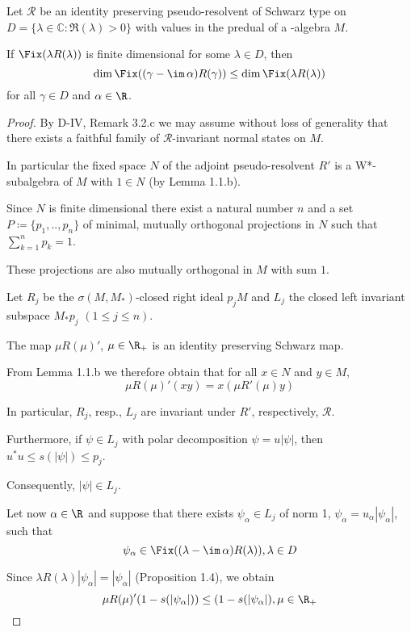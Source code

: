 \begin{proposition}\label{prop:d3-2.1}
Let $\mathcal{R}$ be an identity preserving pseudo-resolvent of Schwarz type on $D = \{\lambda \in \mathbb{C} \colon \Re(\lambda) > 0\}$ with values in the predual of a \WA-algebra $M$.

If $\Fix(\lambda R(\lambda))$ is finite dimensional for some $\lambda \in D$, then
\[
\dim \Fix((\gamma - \im\,\alpha)R(\gamma)) \leq \dim \Fix(\lambda R(\lambda))
\]
for all $\gamma \in D$ and $\alpha \in \R$.
\end{proposition}

\begin{proof}
By D-IV, Remark 3.2.c we may assume without loss of generality that there exists a faithful family of $\mathcal{R}$-invariant normal states on $M$.

In particular the fixed space $N$ of the adjoint pseudo-resolvent $R'$ is a W*-subalgebra of $M$ with $1 \in N$ (by Lemma 1.1.b).

Since $N$ is finite dimensional there exist a natural number $n$ and a set $P \coloneqq \{p_{1}, .., p_{n}\}$ of minimal, mutually orthogonal projections in $N$ such that $\sum_{k=1}^{n} p_{k} = 1$.

These projections are also mutually orthogonal in $M$ with sum $1$.

Let $R_{j}$ be the $\sigma(M,M_{*})$-closed right ideal $p_{j}M$ and $L_{j}$ the closed left invariant subspace $M_{*}p_{j}$ $(1 \leq j \leq n)$.

The map $\mu R(\mu)'$, $\mu \in \R_{+}$ is an identity preserving Schwarz map.

From Lemma 1.1.b we therefore obtain that for all $x \in N$ and $y \in M$,
\[
\mu R(\mu)'(xy) = x(\mu R'(\mu)y)
\]

In particular, $R_{j}$, resp., $L_{j}$ are invariant under $R'$, respectively, $\mathcal{R}$.

Furthermore, if $\psi \in L_{j}$ with polar decomposition $\psi = u|\psi|$, then $u^{*}u \leq s(|\psi|) \leq p_{j}$.

Consequently, $|\psi| \in L_{j}$.

Let now $\alpha \in \R$ and suppose that there exists $\psi_{\alpha} \in L_{j}$ of norm 1, $\psi_{\alpha} = u_{\alpha}|\psi_{\alpha}|$, such that
\[
\psi_{\alpha} \in \Fix((\lambda - \im\,\alpha)R(\lambda)) , \lambda \in D
\]

Since $\lambda R(\lambda)|\psi_{\alpha}| = |\psi_{\alpha}|$ (Proposition 1.4), we obtain
\[
\mu R(\mu)'(1-s(|\psi_{\alpha}|)) \leq (1-s(|\psi_{\alpha}|) , \mu \in \R_{+}
\]


\end{proof}
